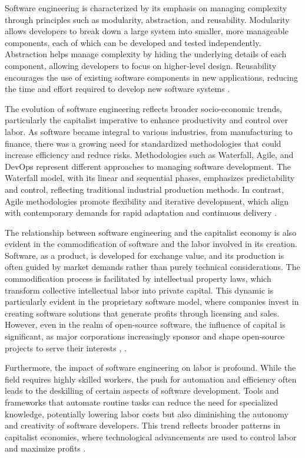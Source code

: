 \begin{refsection}
Software engineering is characterized by its emphasis on managing complexity through principles such as modularity, abstraction, and reusability. Modularity allows developers to break down a large system into smaller, more manageable components, each of which can be developed and tested independently. Abstraction helps manage complexity by hiding the underlying details of each component, allowing developers to focus on higher-level design. Reusability encourages the use of existing software components in new applications, reducing the time and effort required to develop new software systems \cite[pp.~32-35]{mcconnell2007code}.

The evolution of software engineering reflects broader socio-economic trends, particularly the capitalist imperative to enhance productivity and control over labor. As software became integral to various industries, from manufacturing to finance, there was a growing need for standardized methodologies that could increase efficiency and reduce risks. Methodologies such as Waterfall, Agile, and DevOps represent different approaches to managing software development. The Waterfall model, with its linear and sequential phases, emphasizes predictability and control, reflecting traditional industrial production methods. In contrast, Agile methodologies promote flexibility and iterative development, which align with contemporary demands for rapid adaptation and continuous delivery \cite[pp.~77-82]{sommerville2016software}.

The relationship between software engineering and the capitalist economy is also evident in the commodification of software and the labor involved in its creation. Software, as a product, is developed for exchange value, and its production is often guided by market demands rather than purely technical considerations. The commodification process is facilitated by intellectual property laws, which transform collective intellectual labor into private capital. This dynamic is particularly evident in the proprietary software model, where companies invest in creating software solutions that generate profits through licensing and sales. However, even in the realm of open-source software, the influence of capital is significant, as major corporations increasingly sponsor and shape open-source projects to serve their interests \cite[pp.~104-110]{braverman1974labor}, \cite[pp.~210-215]{raymond2022bazaar}.

Furthermore, the impact of software engineering on labor is profound. While the field requires highly skilled workers, the push for automation and efficiency often leads to the deskilling of certain aspects of software development. Tools and frameworks that automate routine tasks can reduce the need for specialized knowledge, potentially lowering labor costs but also diminishing the autonomy and creativity of software developers. This trend reflects broader patterns in capitalist economies, where technological advancements are used to control labor and maximize profits \cite[pp.~104-110]{braverman1974labor}.


\end{refsection}
